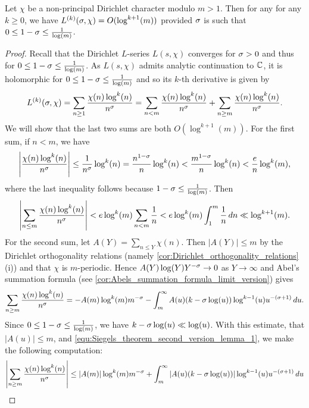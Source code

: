     \begin{lemma}\label{lem:log_growth_of_Dirichlet_L-series_near_1}
      Let $\chi$ be a non-principal Dirichlet character modulo $m > 1$. Then for any for any $k \ge 0$, we have $L^{(k)}(\sigma,\chi) = O(\log^{k+1}(m))$ provided $\sigma$ is such that $0 \le 1-\sigma \le \frac{1}{\log(m)}$.
    \end{lemma}
    \begin{proof}
      Recall that the Dirichlet $L$-series $L(s,\chi)$ converges for $\sigma > 0$ and thus for $0 \le 1-\sigma \le \frac{1}{\log(m)}$. As $L(s,\chi)$ admits analytic continuation to $\mathbb{C}$, it is holomorphic for $0 \le 1-\sigma \le \frac{1}{\log(m)}$ and so its $k$-th derivative is given by
      \[
        L^{(k)}(\sigma,\chi) = \sum_{n \ge 1}\frac{\chi(n)\log^{k}(n)}{n^{\sigma}} = \sum_{n < m}\frac{\chi(n)\log^{k}(n)}{n^{\sigma}}+\sum_{n \ge m}\frac{\chi(n)\log^{k}(n)}{n^{\sigma}}.
      \]
      We will show that the last two sums are both $O(\log^{k+1}(m))$. For the first sum, if $n < m$, we have
      \[
        \left|\frac{\chi(n)\log^{k}(n)}{n^{\sigma}}\right| \le \frac{1}{n^{\sigma}}\log^{k}(n) = \frac{n^{1-\sigma}}{n}\log^{k}(n) < \frac{m^{1-\sigma}}{n}\log^{k}(n) < \frac{e}{n}\log^{k}(m),
      \]
      where the last inequality follows because $1-\sigma \le \frac{1}{\log(m)}$. Then
      \[
        \left|\sum_{n \le m}\frac{\chi(n)\log^{k}(n)}{n^{\sigma}}\right| < e\log^{k}(m)\sum_{n < m}\frac{1}{n} < e\log^{k}(m)\int_{1}^{m}\frac{1}{n}\,dn \ll \log^{k+1}(m).
      \]
      For the second sum, let $A(Y) = \sum_{n \le Y}\chi(n)$. Then $|A(Y)| \le m$ by the Dirichlet orthogonality relations (namely \cref{cor:Dirichlet_orthogonality_relations} (i)) and that $\chi$ is $m$-periodic. Hence $A(Y)\log(Y)Y^{-\sigma} \to 0$ as $Y \to \infty$ and Abel's summation formula (see \cref{cor:Abels_summation_formula_limit_version}) gives
      \begin{equation}\label{equ:Siegels_theorem_second_version_lemma_1}
        \sum_{n \ge m}\frac{\chi(n)\log^{k}(n)}{n^{\sigma}} = -A(m)\log^{k}(m)m^{-\sigma}-\int_{m}^{\infty}A(u)(k-\sigma\log(u))\log^{k-1}(u)u^{-(\sigma+1)}\,du.
      \end{equation}
      Since $0 \le 1-\sigma \le \frac{1}{\log(m)}$, we have $k-\sigma\log(u) \ll \log(u)$. With this estimate, that $|A(u)| \le m$, and \cref{equ:Siegels_theorem_second_version_lemma_1}, we make the following computation:
      \begin{align*}
        \left|\sum_{n \ge m}\frac{\chi(n)\log^{k}(n)}{n^{\s}}\right| &\le |A(m)|\log^{k}(m)m^{-\s}+\int_{m}^{\infty}|A(u)(k-\s\log(u))|\log^{k-1}(u)u^{-(\s+1)}\,du \\

\end{align*}
\end{proof}
